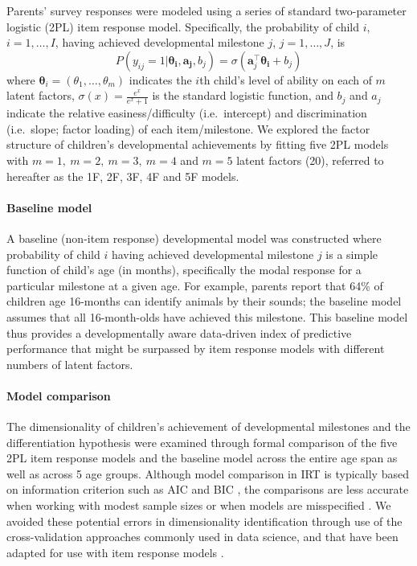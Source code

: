 \documentclass[man, floatsintext]{apa7}
\begin{document}
Parents' survey responses were modeled using a series of standard two-parameter logistic (2PL) item response model. Specifically, the probability of child $i$, $i = 1, \ldots, I$, having achieved developmental milestone $j$, $j = 1, \ldots, J$, is \begin{equation}\label{eq:irt}
P(y_{ij} = 1 | \boldsymbol{\theta_i}, \boldsymbol{a_j}, b_j) = \sigma(\boldsymbol{a}_{j}^{\top}\boldsymbol{\theta_i} + b_j)
\end{equation} where $\boldsymbol{\theta}_{i}=(\theta_1, \dots, \theta_m)$ indicates the $i$th child's level of ability on each of $m$ latent factors, $\sigma(x) = \frac{e^x}{e^x + 1}$ is the standard logistic function, and $b_j$ and $a_j$ indicate the relative easiness/difficulty (i.e.~intercept) and discrimination (i.e.~slope; factor loading) of each item/milestone.
We explored the factor structure of children's developmental achievements by fitting five 2PL models with $m = 1, \ m = 2, \ m = 3, \ m = 4$ and $m = 5$ latent factors (20), referred to hereafter as the 1F, 2F, 3F, 4F and 5F models.


\paragraph{Baseline model}
A baseline (non-item response) developmental model was constructed where probability of child $i$ having achieved developmental milestone $j$ is a simple function of child's age (in
months), specifically the modal response for a particular milestone at a given age. For example, parents report that 64\% of children age 16-months can identify animals by their sounds; the baseline model assumes that all 16-month-olds have achieved this milestone. This baseline model thus provides a developmentally aware data-driven index of predictive performance that might be surpassed by item response models with different numbers of latent factors.

\paragraph{Model comparison}

The dimensionality of children's achievement of developmental milestones and the differentiation hypothesis were examined through formal comparison of the five 2PL item response models and the baseline model across the entire age span as well as across 5 age groups. Although model comparison in IRT is typically based on information criterion such as AIC and BIC \parencite{maydeu-olivares2013}, the comparisons are less accurate when working with modest sample sizes or when models are misspeciﬁed \parencite{mcdonald1995}. We avoided these potential errors in dimensionality identification through use of the cross-validation approaches commonly used in data science, and that have been adapted for use with item response models \parencite{bergner2012}.
\end{document}
